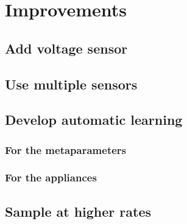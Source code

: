 \chapter{Improvements}
\label{chapter-improvements}
\section{Add voltage sensor}
\section{Use multiple sensors}
\section{Develop automatic learning}
\subsection{For the metaparameters}
\subsection{For the appliances}
\section{Sample at higher rates}